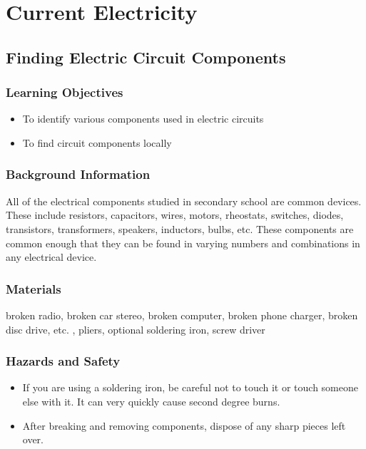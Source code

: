 \section{Current Electricity}

\subsection{Finding Electric Circuit Components}

\subsubsection*{Learning Objectives}
\begin{itemize}
\item{To identify various components used in electric circuits} 
\item{To find circuit components locally} 
\end{itemize}

\subsubsection*{Background Information}
All of the electrical components studied in secondary school are common devices. These include resistors, capacitors, wires, motors, rheostats, switches, diodes, transistors, transformers, speakers, inductors, bulbs, etc. These components are common enough that they can be found in varying numbers and combinations in any electrical device. 

\subsubsection*{Materials}
broken radio, broken car stereo, broken computer, broken phone charger, broken disc drive, etc. , pliers, optional soldering iron, screw driver

\subsubsection*{Hazards and Safety}
\begin{itemize}
\item{If you are using a soldering iron, be careful not to touch it or touch someone else with it. It can very quickly cause second degree burns.} 
\item{After breaking and removing components, dispose of any sharp pieces left over.} 
\end{itemize}

